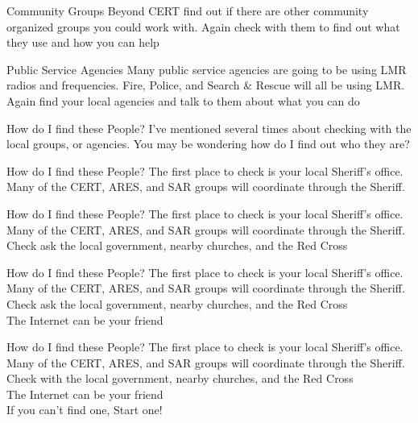 \documentclass[11pt]{beamer}
\begin{document}
\begin{frame}{Community Groups}
Beyond CERT find out if there are other community organized groups you could work with. Again check with them to find out what they use and how you can help
\end{frame}

\begin{frame}{Public Service Agencies}
Many public service agencies are going to be using LMR radios and frequencies. Fire, Police, and Search \& Rescue will all be using LMR.\\
Again find your local agencies and talk to them about what you can do 
\end{frame}

\begin{frame}{How do I find these People?}
I've mentioned several times about checking with the local groups, or agencies. You may be wondering how do I find out who they are?
\end{frame}

\begin{frame}{How do I find these People?}
The first place to check is your local Sheriff's office. Many of the CERT, ARES, and SAR groups will coordinate through the Sheriff.
\end{frame}

\begin{frame}{How do I find these People?}
The first place to check is your local Sheriff's office. Many of the CERT, ARES, and SAR groups will coordinate through the Sheriff. \\
Check ask the local government, nearby churches, and the Red Cross
\end{frame}

\begin{frame}{How do I find these People?}
The first place to check is your local Sheriff's office. Many of the CERT, ARES, and SAR groups will coordinate through the Sheriff. \\
Check ask the local government, nearby churches, and the Red Cross \\
The Internet can be your friend
\end{frame}

\begin{frame}{How do I find these People?}
The first place to check is your local Sheriff's office. Many of the CERT, ARES, and SAR groups will coordinate through the Sheriff. \\
Check with the local government, nearby churches, and the Red Cross \\
The Internet can be your friend \\
If you can't find one, Start one!
\end{frame}
\end{document}
